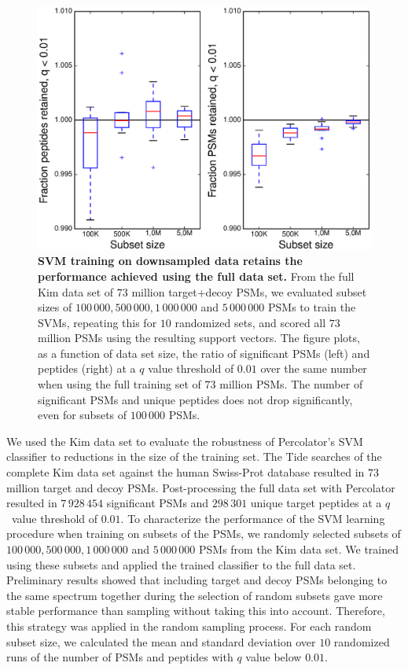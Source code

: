 \documentclass{article}
\begin{document}
\begin{figure}
\begin{center}
\includegraphics[width=0.6\linewidth]{./img/subset-performance}
\caption{\label{fig:subset}\textbf{SVM training on downsampled data
    retains the performance achieved using the full data set.}  From
  the full Kim data set of $73$ million target+decoy PSMs, we
  evaluated subset sizes of $100\,000, 500\,000, 1\,000\,000$ and
  $5\,000\,000$ PSMs to train the SVMs, repeating this for $10$
  randomized sets, and scored all $73$ million PSMs using the
  resulting support vectors. The figure plots, as a function of data
  set size, the ratio of significant PSMs (left) and peptides (right)
  at a $q$ value threshold of $0.01$ over the same number when using
  the full training set of $73$ million PSMs. The number of 
  significant PSMs and unique peptides does not drop significantly, 
  even for subsets of $100\,000$ PSMs.}
\end{center}
\end{figure}

We used the Kim data set to evaluate the robustness of Percolator's
SVM classifier to reductions in the size of the training set.  The
Tide searches of the complete Kim data set against the human
Swiss-Prot database resulted in $73$ million target and decoy PSMs.
Post-processing the full data set with Percolator resulted in
$7\,928\,454$ significant PSMs and $298\,301$ unique target peptides
at a $q$~value threshold of $0.01$.  To characterize the performance
of the SVM learning procedure when training on subsets of the PSMs, we
randomly selected subsets of $100\,000, 500\,000, 1\,000\,000$ and
$5\,000\,000$ PSMs from the Kim data set.  We trained using these
subsets and applied the trained classifier to the full data
set. Preliminary results showed that including target and decoy PSMs
belonging to the same spectrum together during the selection of random
subsets gave more stable performance than sampling without taking this
into account. Therefore, this strategy was applied in the random
sampling process. For each random subset size, we calculated the mean
and standard deviation over $10$ randomized runs of the number of PSMs
and peptides with $q$ value below $0.01$.
\end{document}
